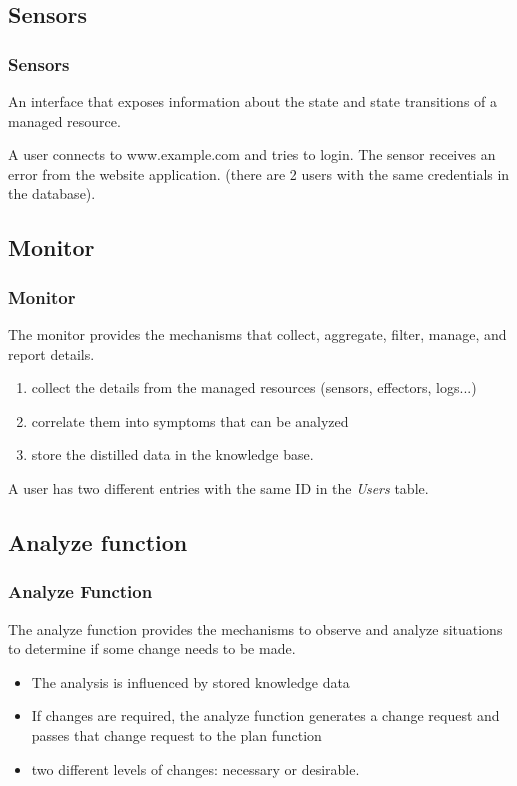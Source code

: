 \documentclass[11pt]{beamer}
\begin{document}
    \subsection{Sensors}
\begin{frame}
\frametitle{Sensors}
\begin{definition}
An interface that exposes information about the state and state transitions of a managed resource.
\begin{example}
A user connects to www.example.com and tries to login. The sensor receives an error from the website application. (there are 2 users with the same credentials in the database).
\end{example}
\end{definition}
\end{frame}

	\subsection{Monitor}
\begin{frame}
\frametitle{Monitor}
The monitor provides the mechanisms that collect, aggregate, filter,
manage, and report details.
\newline
\begin{enumerate}
\item collect the details from the managed resources (sensors, effectors, logs...)
\item correlate them into symptoms that can be analyzed
\item store the distilled data in the knowledge base.
\end{enumerate}
\begin{example}
A user has two different entries with the same ID in the \textit{Users} table.
\end{example}
\end{frame}

    \subsection{Analyze function}
\begin{frame}
\frametitle{Analyze Function}
The analyze function provides the mechanisms to observe and analyze
situations to determine if some change needs to be made.\newline
\begin{itemize}
\item The analysis is influenced by stored knowledge data
\item If changes are required, the analyze function generates a change request and passes that change request to the plan function
\item two different levels of changes: necessary or desirable.
\end{itemize}
\end{frame}
\end{document}
